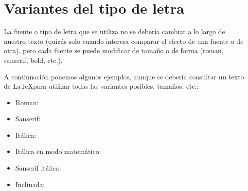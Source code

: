 \section{Variantes del tipo de letra}
La fuente o tipo de letra que se utiliza no se debería cambiar a lo largo de nuestro
texto (quizás solo cuando interesa comparar el efecto de una fuente o de otra),
pero cada fuente se puede modificar de tamaño o de forma (roman, sanserif, bold, etc.).

A continuación ponemos algunos ejemplos, aunque se debería consultar un texto de
\LaTeX para utilizar todas las variantes posibles, tamaños, etc.:

\begin{itemize}
\item Roman:
  
  \begin{SideBySideExample}[xrightmargin=2cm]
    {\rmfamily{}}
  \end{SideBySideExample}

\item Sanserif:
    
  \begin{SideBySideExample}[xrightmargin=2cm]
    {\sffamily{}}
  \end{SideBySideExample}

\item Itálica:
  
  \begin{SideBySideExample}[xrightmargin=2cm]
    {\itshape{}}
  \end{SideBySideExample}
  
\item Itálica en modo matemático:
  
  \begin{SideBySideExample}[xrightmargin=2cm]
  \end{SideBySideExample}

\item Sanserif itálica:
  
  \begin{SideBySideExample}[xrightmargin=2cm]
    {\sffamily\itshape{}}
  \end{SideBySideExample}

\item Inclinada:
  
  \begin{SideBySideExample}[xrightmargin=2cm]
    {\slshape{}}
  \end{SideBySideExample}
  

\end{itemize}
